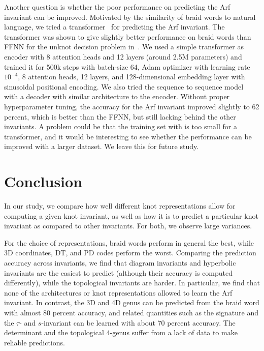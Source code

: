 \documentclass[11pt]{article}
\numberwithin{equation}{section}
\begin{document}
Another question is whether the poor performance on predicting the Arf invariant can be improved. Motivated by the similarity of braid words to natural language, we tried a transformer~\cite{Vaswani:2017aaa} for predicting the Arf invariant. The transformer was shown to give slightly better performance on braid words than FFNN for the unknot decision problem in~\cite{Gukov:2020qaj}. We used a simple transformer as encoder with 8 attention heads and 12 layers (around 2.5M parameters) and trained it for 500k steps with batch-size 64, Adam optimizer with learning rate $10^{-4}$, 8 attention heads, 12 layers, and 128-dimensional embedding layer with sinusoidal positional encoding.  We also tried the sequence to sequence model~\cite{Int2Int} with a decoder with similar architecture to the encoder. Without proper hyperparameter tuning, the accuracy for the Arf invariant improved slightly to 62 percent, which is better than the FFNN, but still lacking behind the other invariants. A problem could be that the training set with is too small for a transformer, and it would be interesting to see whether the performance can be improved with a larger dataset. We leave this for future study.


\section{Conclusion}
\label{sec:Conclusions}
In our study, we compare how well different knot representations allow for computing a given knot invariant, as well as how it is to predict a particular knot invariant as compared to other invariants. For both, we observe large variances.

For the choice of representations, braid words perform in general the best, while 3D coordinates, DT, and PD codes perform the worst. Comparing the prediction accuracy across invariants, we find that diagram invariants and hyperbolic invariants are the easiest to predict (although their accuracy is computed differently), while the topological invariants are harder. In particular, we find that none of the architectures or knot representations allowed to learn the Arf invariant. In contrast, the 3D and 4D genus can be predicted from the braid word with almost 80 percent accuracy, and related quantities such as the signature and the $\tau$- and $s$-invariant can be learned with about 70 percent accuracy. The determinant and the topological 4-genus suffer from a lack of data to make reliable predictions.
\end{document}
